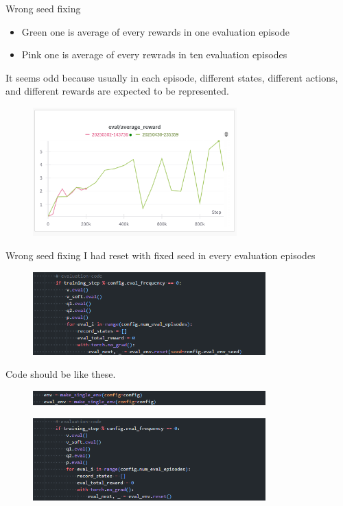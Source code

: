 \documentclass[8pt]{beamer}
\begin{document}
\begin{frame}{Wrong seed fixing}
    \begin{itemize}
        \item Green one is average of every rewards in one evaluation episode
        \item Pink one is average of every rewrads in ten evaluation episodes
    \end{itemize}
    It seems odd because usually in each episode, different states, different actions, and different rewards are expected to be represented.
    \begin{figure}
        \includegraphics[width=0.7\textwidth]{WrongSeedSetting.png}
    \end{figure}
\end{frame}

\begin{frame}{Wrong seed fixing}
    I had reset with fixed seed in every evaluation episodes
    \begin{figure}
        \includegraphics[width=0.8\textwidth]{WrongEvalSeed}
    \end{figure}

    Code should be like these.
    \begin{figure}
        \includegraphics[width=0.8\textwidth]{FixEvalSeedFix1.png}
    \end{figure}    
    \begin{figure}
        \includegraphics[width=0.8\textwidth]{FixEvalSeedFix2.png}
    \end{figure}
\end{frame}
\end{document}
